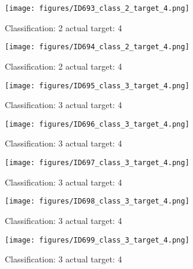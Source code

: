 \begin{figure}[h!]
\begin{center}
\texttt{[image: figures/ID693\_class\_2\_target\_4.png]}
\end{center}
\caption{ Classification: 2 actual target: 4}
\label{fig:ID693_class_2_target_4}
\end{figure}
\begin{figure}[h!]
\begin{center}
\texttt{[image: figures/ID694\_class\_2\_target\_4.png]}
\end{center}
\caption{ Classification: 2 actual target: 4}
\label{fig:ID694_class_2_target_4}
\end{figure}
\begin{figure}[h!]
\begin{center}
\texttt{[image: figures/ID695\_class\_3\_target\_4.png]}
\end{center}
\caption{ Classification: 3 actual target: 4}
\label{fig:ID695_class_3_target_4}
\end{figure}
\begin{figure}[h!]
\begin{center}
\texttt{[image: figures/ID696\_class\_3\_target\_4.png]}
\end{center}
\caption{ Classification: 3 actual target: 4}
\label{fig:ID696_class_3_target_4}
\end{figure}
\begin{figure}[h!]
\begin{center}
\texttt{[image: figures/ID697\_class\_3\_target\_4.png]}
\end{center}
\caption{ Classification: 3 actual target: 4}
\label{fig:ID697_class_3_target_4}
\end{figure}
\begin{figure}[h!]
\begin{center}
\texttt{[image: figures/ID698\_class\_3\_target\_4.png]}
\end{center}
\caption{ Classification: 3 actual target: 4}
\label{fig:ID698_class_3_target_4}
\end{figure}
\begin{figure}[h!]
\begin{center}
\texttt{[image: figures/ID699\_class\_3\_target\_4.png]}
\end{center}
\caption{ Classification: 3 actual target: 4}
\label{fig:ID699_class_3_target_4}
\end{figure}
